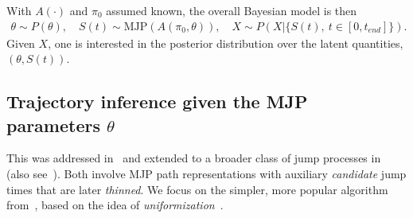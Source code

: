 With $A(\cdot)$ and $\pi_0$ assumed known, the overall Bayesian model is then 
\begin{align}
  \label{eq:bayes_model}
  \theta \sim P(\theta), \quad S(t) \sim \text{MJP}(A(\pi_0, \theta)), \quad X \sim P(X|\{S(t),\ t \in [0,t_{end}]\}).
\end{align}
Given $X$, one is interested in the posterior distribution over the latent quantities, $(\theta,S(t))$. 

\subsection{Trajectory inference given the MJP parameters $\theta$}
This was addressed in~\cite{RaoTeh13}  and extended to a broader class of jump processes in~\cite{RaoTeh12} (also see~\cite{FearnSher2006, Hobolth09, Elhaygibbssampling}). 
Both involve MJP path representations with auxiliary {\em candidate} jump times that are later {\em thinned}.  
We focus on the simpler, more popular algorithm from~\cite{RaoTeh13}, based on the idea of {\em uniformization}~\citep{Jen1953}. 

